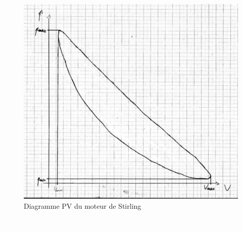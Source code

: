 \begin{figure}[h]
    \centering
    \includegraphics[width=\linewidth]{figures/scan_graph.png}
    \caption{Diagramme PV du moteur de Stirling}
    \label{fig:diag_pv}
\end{figure}

\textcolor{white}{le jeu (t'as perdu)}
